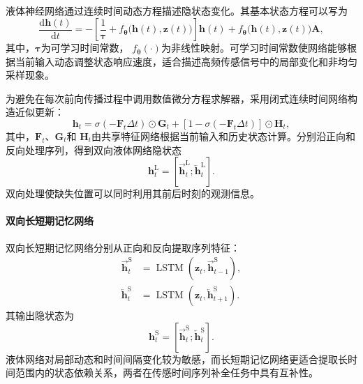 液体神经网络通过连续时间动态方程描述隐状态变化。其基本状态方程可以写为
\begin{equation}
    \frac{\mathrm{d}\boldsymbol{h}(t)}{\mathrm{d}t}
    =
    -
    \left[
    \frac{1}{\boldsymbol{\tau}}
    +f_{\boldsymbol{\theta}}
    \bigl(\boldsymbol{h}(t),\boldsymbol{z}(t)\bigr)
    \right]\boldsymbol{h}(t)
    +
    f_{\boldsymbol{\theta}}
    \bigl(\boldsymbol{h}(t),\boldsymbol{z}(t)\bigr)
    \boldsymbol{A},
\end{equation}
其中，$\boldsymbol{\tau}$为可学习时间常数，
$f_{\boldsymbol{\theta}}(\cdot)$为非线性映射。可学习时间常数使网络能够根据当前输入动态调整状态响应速度，适合描述高频传感信号中的局部变化和非均匀采样现象。

为避免在每次前向传播过程中调用数值微分方程求解器，采用闭式连续时间网络构造近似更新：
\begin{equation}
    \boldsymbol{h}_{t}
    =
    \sigma\left(
    -\boldsymbol{F}_{t}\Delta t
    \right)\odot\boldsymbol{G}_{t}
    +
    \left[
    1-\sigma\left(
    -\boldsymbol{F}_{t}\Delta t
    \right)
    \right]\odot\boldsymbol{H}_{t},
\end{equation}
其中，$\boldsymbol{F}_{t}$、$\boldsymbol{G}_{t}$和
$\boldsymbol{H}_{t}$由共享特征网络根据当前输入和历史状态计算。分别沿正向和反向处理序列，得到双向液体网络隐状态
\begin{equation}
    \boldsymbol{h}_{t}^{\mathrm{L}}
    =
    \left[
    \overrightarrow{\boldsymbol{h}}_{t}^{\mathrm{L}};
    \overleftarrow{\boldsymbol{h}}_{t}^{\mathrm{L}}
    \right].
\end{equation}
双向处理使缺失位置可以同时利用其前后时刻的观测信息。

\paragraph{双向长短期记忆网络}

双向长短期记忆网络分别从正向和反向提取序列特征：
\begin{align}
    \overrightarrow{\boldsymbol{h}}_{t}^{\mathrm{S}}
    &=
    \operatorname{LSTM}
    \left(
    \boldsymbol{z}_{t},
    \overrightarrow{\boldsymbol{h}}_{t-1}^{\mathrm{S}}
    \right),\\
    \overleftarrow{\boldsymbol{h}}_{t}^{\mathrm{S}}
    &=
    \operatorname{LSTM}
    \left(
    \boldsymbol{z}_{t},
    \overleftarrow{\boldsymbol{h}}_{t+1}^{\mathrm{S}}
    \right).
\end{align}
其输出隐状态为
\begin{equation}
    \boldsymbol{h}_{t}^{\mathrm{S}}
    =
    \left[
    \overrightarrow{\boldsymbol{h}}_{t}^{\mathrm{S}};
    \overleftarrow{\boldsymbol{h}}_{t}^{\mathrm{S}}
    \right].
\end{equation}
液体网络对局部动态和时间间隔变化较为敏感，而长短期记忆网络更适合提取长时间范围内的状态依赖关系，两者在传感时间序列补全任务中具有互补性。

